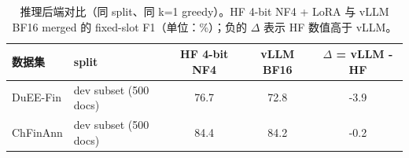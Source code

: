 \begin{table}[htbp]
\centering
\caption{推理后端对比（同 split、同 k=1 greedy）。HF 4-bit NF4 + LoRA 与 vLLM BF16 merged 的 fixed-slot F1（单位：\%）；负的 $\Delta$ 表示 HF 数值高于 vLLM。}
\label{tab:backend}
\small
\begin{tabular}{llSSS}
\toprule
数据集 & split & {HF 4-bit NF4} & {vLLM BF16} & {$\Delta$ = vLLM - HF} \\
\midrule
DuEE-Fin & dev subset (500 docs) & 76.7 & 72.8 & -3.9 \\
ChFinAnn & dev subset (500 docs) & 84.4 & 84.2 & -0.2 \\
\bottomrule
\end{tabular}
\end{table}
